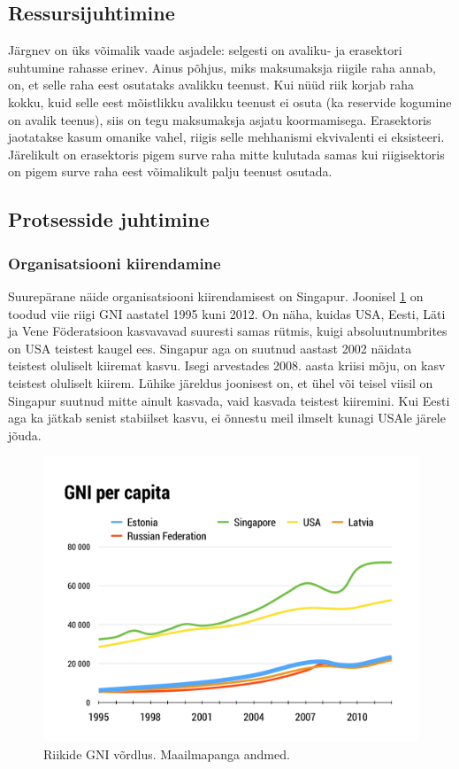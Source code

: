 \documentclass{article}
\begin{document}
\subsection{Ressursijuhtimine}
Järgnev on üks võimalik vaade asjadele: selgesti on avaliku- ja erasektori suhtumine rahasse erinev. Ainus põhjus, miks maksumaksja riigile raha annab, on, et selle raha eest osutataks avalikku teenust. Kui nüüd riik korjab raha kokku, kuid selle eest mõistlikku avalikku teenust ei osuta (ka reservide kogumine on avalik teenus), siis on tegu maksumaksja asjatu koormamisega. Erasektoris jaotatakse kasum omanike vahel, riigis selle mehhanismi ekvivalenti ei eksisteeri. Järelikult on erasektoris pigem surve raha mitte kulutada samas kui riigisektoris on pigem surve raha eest võimalikult palju teenust osutada.  

\subsection{Protsesside juhtimine}
\subsubsection{Organisatsiooni kiirendamine}
Suurepärane näide organisatsiooni kiirendamisest on Singapur. Joonisel \ref{fig:kasv} on toodud viie riigi GNI aastatel 1995 kuni 2012. On näha, kuidas USA, Eesti, Läti ja Vene Föderatsioon kasvavavad suuresti samas rütmis, kuigi absoluutnumbrites on USA teistest kaugel ees. Singapur aga on suutnud aastast 2002 näidata teistest oluliselt kiiremat kasvu. Isegi arvestades 2008. aasta kriisi mõju, on kasv teistest oluliselt kiirem. Lühike järeldus joonisest on, et ühel või teisel viisil on Singapur suutnud mitte ainult kasvada, vaid kasvada teistest kiiremini. Kui Eesti aga ka jätkab senist stabiilset kasvu, ei õnnestu meil ilmselt kunagi USAle järele jõuda. 

\begin{figure}[h]
	\begin{center}
		\includegraphics[width=\textwidth]{kasv.pdf}
		\caption{Riikide GNI võrdlus. Maailmapanga andmed.}
		\label{fig:kasv}
	\end{center}
\end{figure}
\end{document}
